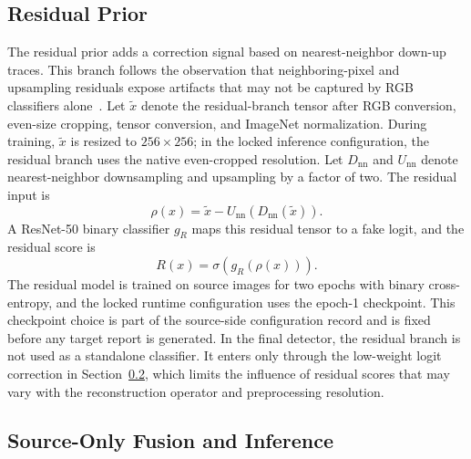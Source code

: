 \documentclass[lettersize,journal]{IEEEtran}
\begin{document}
\subsection{Residual Prior}
\label{sec:method_residual}

The residual prior adds a correction signal based on nearest-neighbor down-up traces. This branch follows the observation that neighboring-pixel and upsampling residuals expose artifacts that may not be captured by RGB classifiers alone~\cite{tan2024npr}. Let $\tilde{x}$ denote the residual-branch tensor after RGB conversion, even-size cropping, tensor conversion, and ImageNet normalization. During training, $\tilde{x}$ is resized to $256 \times 256$; in the locked inference configuration, the residual branch uses the native even-cropped resolution. Let $D_{\mathrm{nn}}$ and $U_{\mathrm{nn}}$ denote nearest-neighbor downsampling and upsampling by a factor of two. The residual input is
\begin{equation}
    \rho(x)=\tilde{x}-U_{\mathrm{nn}}(D_{\mathrm{nn}}(\tilde{x})).
\end{equation}
A ResNet-50 binary classifier $g_R$ maps this residual tensor to a fake logit, and the residual score is
\begin{equation}
    R(x)=\sigma(g_R(\rho(x))).
\end{equation}
The residual model is trained on source images for two epochs with binary cross-entropy, and the locked runtime configuration uses the epoch-1 checkpoint. This checkpoint choice is part of the source-side configuration record and is fixed before any target report is generated. In the final detector, the residual branch is not used as a standalone classifier. It enters only through the low-weight logit correction in Section~\ref{sec:method_fusion}, which limits the influence of residual scores that may vary with the reconstruction operator and preprocessing resolution.

\subsection{Source-Only Fusion and Inference}
\label{sec:method_fusion}
\end{document}
